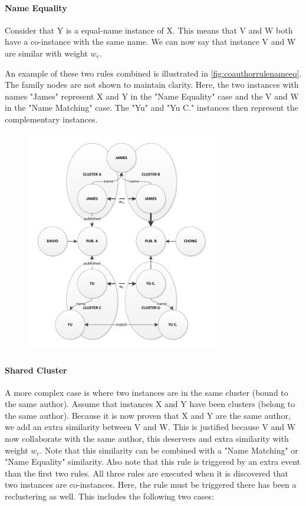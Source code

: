 \paragraph{Name Equality} Consider that Y is a equal-name instance of X. This means that V and W both have a co-instance with the same name. We can now say that instance V and W are similar with weight $w_e$.

An example of these two rules combined is illustrated in \autoref{fig:coauthorrulenameeq}. The family nodes are not shown to maintain clarity. Here, the two instances with names "James" represent X and Y in the "Name Equality" case and the V and W in the "Name Matching" case. The "Yu" and "Yu C." instances then represent the complementary instances.

\begin{figure}[htb]
	\centering
		\includegraphics[width=0.75\textwidth]{fig/coauthorrulenameeq}
	\caption{}
	\label{fig:coauthorrulenameeq}
\end{figure}

\paragraph{Shared Cluster} A more complex case is where two instances are in the same cluster (bound to the same author). Assume that instances X and Y have been clusters (belong to the same author). Because it is now proven that X and Y are the same author, we add an extra similarity between V and W. This is justified because V and W now collaborate with the same author, this deservers and extra similarity with weight $w_c$. Note that this similarity can be combined with a "Name Matching" or "Name Equality" similarity. Also note that this rule is triggered by an extra event than the first two rules. All three rules are executed when it is discovered that two instances are co-instances. Here, the rule must be triggered there has been a reclustering as well. This includes the following two cases:

